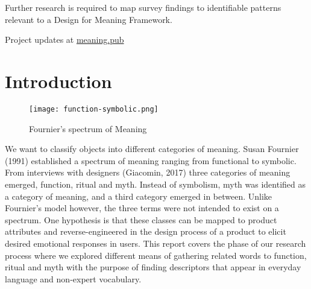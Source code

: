 \documentclass[12pt, usenames, dvipsnames]{report}
\begin{document}
\begin{flushleft}
Further research is required to map survey findings to identifiable patterns relevant to a Design for Meaning Framework.


\clearpage
\begingroup
 \hypersetup{linkcolor=black}
 \tableofcontents
\endgroup

\vspace*{\fill}

\begingroup


Project updates at \href{https://meaning.pub}{meaning.pub}

\endgroup
\clearpage


\chapter*{Introduction}
\label{chap:intro}

\vspace*{1.2em}
\begin{figure}[!htbp]
  \hspace*{-3.666em}
  \texttt{[image: function-symbolic.png]}
  \caption{Fournier's spectrum of Meaning}
  \label{fig:function-symbolic}
\end{figure}
\vspace*{1.2em}

We want to classify objects into different categories of meaning.
Susan Fournier (1991) \cite{fournier1991} established a spectrum of meaning ranging from functional to symbolic.
From interviews with designers (Giacomin, 2017) \cite{giacomin2017} three categories of meaning emerged, function, ritual and myth.
Instead of symbolism, myth was identified as a category of meaning, and a third category emerged in between.
Unlike Fournier’s model however, the three terms were not intended to exist on a spectrum.
One hypothesis is that these classes can be mapped to product attributes and reverse-engineered in the design process of a product to elicit desired emotional responses in users.
This report covers the phase of our research process where we explored different means of gathering related words to function, ritual and myth with the purpose of finding descriptors that appear in everyday language and non-expert vocabulary.


\end{flushleft}
\end{document}

